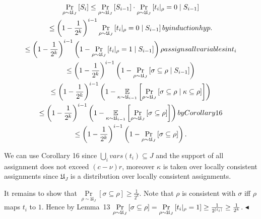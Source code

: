 \documentclass[10pt,a4paper]{article}
\begin{document}
\[\begin{gathered}
\displaystyle\Pr\limits_{\rho\sim\mathfrak{U}_{J}}\left[S_{i}\right] \displaystyle\leq\Pr\limits_{\rho\sim\mathfrak{U}_{J}}\left[S_{i-1}\right]%
\cdot\Pr\limits_{\rho\sim\mathfrak{U}_{J}}\left[t_{i}|_{\rho}=0\mid S_{i-1}\right] \\
\displaystyle\leq\left(1-\frac{1}{2^{k}}\right)^{i-1}\Pr\limits_{\rho\sim%
\mathfrak{U}_{J}}\left[t_{i}|_{\rho}=0\mid S_{i-1}\right] by
induction
hyp. \\
\displaystyle\leq\left(1-\frac{1}{2^{k}}\right)^{i-1}\left(1-\Pr\limits_{\rho%
\sim\mathfrak{U}_{J}}\left[t_{i}|_{\rho}=1\mid S_{i-1}\right]\right) \rho assigns all variables in t_{i} \\
\displaystyle\leq\left(1-\frac{1}{2^{k}}\right)^{i-1}\left(1-\Pr\limits_{\rho%
\sim\mathfrak{U}_{J}}\left[\sigma\subseteq\rho\mid S_{i-1}\right]\right) \\
\displaystyle\leq\left(1-\frac{1}{2^{k}}\right)^{i-1}\left(1-\operatorname*{%
\mathbb{E}}\limits_{\kappa\sim\mathfrak{U}_{i-1}}\left[\Pr\limits_{\rho\sim%
\mathfrak{U}_{J}}\left[\sigma\subseteq\rho\mid\kappa\subseteq\rho\right]\right%
]\right) \\
\displaystyle\leq\left(1-\frac{1}{2^{k}}\right)^{i-1}\left(1-\operatorname*{%
\mathbb{E}}\limits_{\kappa\sim\mathfrak{U}_{i-1}}\left[\Pr\limits_{\rho\sim%
\mathfrak{U}_{J}}\left[\sigma\subseteq\rho\right]\right]\right) by
Corollary
16 \\
\displaystyle\leq\left(1-\frac{1}{2^{k}}\right)^{i-1}\left(1-\Pr\limits_{\rho%
\sim\mathfrak{U}_{J}}\left[\sigma\subseteq\rho\right]\right).
\end{gathered}\]




We can use Corollary 16 since $\bigcup\limits_{i}\textit{vars}(t_{i})\subseteq J$
and the support of all assignment does not exceed $(c-\nu)r$, moreover $\kappa$ is taken over
locally consistent assignments since $\mathfrak{U}_{J}$ is a distribution over locally consistent
assignments.\par




It remains to show that $\Pr\limits_{\rho\sim\mathfrak{U}_{J}}\left[\sigma\subseteq\rho\right]\geq\frac%
{1}{2^{k}}$. Note that $\rho$ is consistent with $\sigma$ iff $\rho$ maps $t_{i}$ to
$1$. Hence by Lemma 13
$\Pr\limits_{\rho\sim\mathfrak{U}_{J}}\left[\sigma\subseteq\rho\right]=\Pr%
\limits_{\rho\sim\mathfrak{U}_{J}}\left[t_{i}|_{\rho}=1\right]\geq\frac{1}{2^{%
|t_{i}|}}\geq\frac{1}{2^{k}}$.
$\blacktriangleleft$\par
\end{document}
